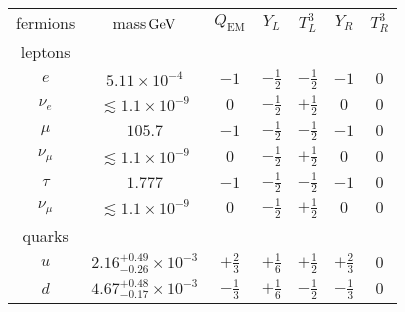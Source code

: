 \begin{table}[tp]
\centering
\begin{tabular}{ccccccc}
fermions                    & mass$\,\eV[G]$                      & $Q_{\mathrm{EM}}$    & $Y_L$                & $T^3_L$              & $Y_R$                & $T^3_R$              \\[0.2em]
leptons                     &                                     &                      &                      &                      &                      &                      \\[0.2em]
$e$                         & $5.11\times10^{-4}$                 & $-1$                 & $-\frac{1}{2}$       & $-\frac{1}{2}$       & $-1$                 & $0$                  \\
$\nu_e$                     & $\lesssim 1.1\times10^{-9}$         & $0$                  & $-\frac{1}{2}$       & $+\frac{1}{2}$       & $0$                  & $0$                  \\
$\mu$                       & $105.7$                             & $-1$                 & $-\frac{1}{2}$       & $-\frac{1}{2}$       & $-1$                 & $0$                  \\
$\nu_\mu$                   & $\lesssim 1.1\times10^{-9}$         & $0$                  & $-\frac{1}{2}$       & $+\frac{1}{2}$       & $0$                  & $0$                  \\
$\tau$                      & $1.777$                             & $-1$                 & $-\frac{1}{2}$       & $-\frac{1}{2}$       & $-1$                 & $0$                  \\
$\nu_\mu$                   & $\lesssim 1.1\times10^{-9}$         & $0$                  & $-\frac{1}{2}$       & $+\frac{1}{2}$       & $0$                  & $0$                  \\[1em]
quarks                      &                                     &                      &                      &                      &                      &                      \\[0.2em]
$u$                         & $2.16^{+0.49}_{-0.26}\times10^{-3}$ & $+\frac{2}{3}$       & $+\frac{1}{6}$       & $+\frac{1}{2}$       & $+\frac{2}{3}$       & $0$                  \\
$d$                         & $4.67^{+0.48}_{-0.17}\times10^{-3}$ & $-\frac{1}{3}$       & $+\frac{1}{6}$       & $-\frac{1}{2}$       & $-\frac{1}{3}$       & $0$                  \\

\end{tabular}
\end{table}
